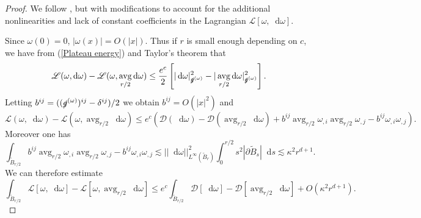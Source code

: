 \documentclass[reqno,12pt,letterpaper]{amsart}
\DeclareMathOperator{\avg}{avg}
\newcommand*\dif{\mathop{}\!\mathrm{d}}
\newcommand{\Lagrange}{\mathscr L}
\newcommand{\DirL}{\mathscr D}
\theoremstyle{definition}
\numberwithin{equation}{section}
\begin{document}
\begin{proof}
We follow \cite[Lemma 4.2]{Miranda66}, but with modifications to account for the additional nonlinearities and lack of constant coefficients in the Lagrangian $\Lagrange[\omega, \dif \omega]$.

Since $\omega(0) = 0$, $|\omega(x)| = O(|x|)$. Thus if $r$ is small enough depending on $c$, we have from (\ref{Plateau energy}) and Taylor's theorem that
\begin{align*}
\Lagrange(\omega, \dif \omega) - \Lagrange(\omega, \avg_{r/2} \dif \omega)
\leq \frac{e^c}{2} \left[|\dif \omega|_{\slashed g^{(\omega)}}^2 - |\avg_{r/2} \dif \omega|_{\slashed g^{(\omega)}}^2\right].
\end{align*}
Letting $b^{ij} = ((\slashed g^{(\omega)})^{ij} - \delta^{ij})/2$ we obtain $b^{ij} = O(|x|^2)$ and
$$\Lagrange(\omega, \dif \omega) - \Lagrange(\omega, \avg_{r/2} \dif \omega) \leq e^c\left(\DirL(\dif \omega) - \DirL(\avg_{r/2} \dif \omega) + b^{ij} \avg_{r/2} \omega_{,i} \avg_{r/2} \omega_{,j} - b^{ij} \omega_{,i} \omega_{,j}\right).$$
Moreover one has
$$\int_{\tilde B_{r/2}} b^{ij} \avg_{r/2} \omega_{,i} \avg_{r/2} \omega_{,j} - b^{ij} \omega_{,i} \omega_{,j} \lesssim ||\dif \omega||_{L^\infty(\tilde B_r)}^2 \int_0^{r/2} s^2 |\partial \tilde B_s| \dif s \lesssim \kappa^2 r^{d + 1}.$$
We can therefore estimate
$$\int_{\tilde B_{r/2}} \Lagrange[\omega, \dif \omega] - \Lagrange[\omega, \avg_{r/2} \dif \omega] \leq e^c \int_{\tilde B_{r/2}} \DirL[\dif \omega] - \DirL[\avg_{r/2} \dif \omega] + O(\kappa^2 r^{d + 1}).$$


\end{proof}
\end{document}
